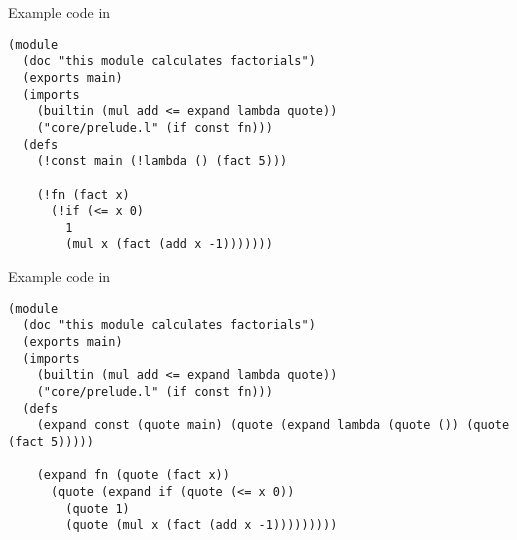 

\begin{frame}
\maketitle
\end{frame}

\begin{frame}[fragile]{Example code in \lang}

\begin{verbatim}
(module
  (doc "this module calculates factorials")
  (exports main)
  (imports
    (builtin (mul add <= expand lambda quote))
    ("core/prelude.l" (if const fn)))
  (defs
    (!const main (!lambda () (fact 5)))

    (!fn (fact x)
      (!if (<= x 0)
        1
        (mul x (fact (add x -1)))))))
\end{verbatim}
\end{frame}

\begin{frame}[fragile]{Example code in \lang}
\begin{verbatim}
(module
  (doc "this module calculates factorials")
  (exports main)
  (imports
    (builtin (mul add <= expand lambda quote))
    ("core/prelude.l" (if const fn)))
  (defs
    (expand const (quote main) (quote (expand lambda (quote ()) (quote (fact 5)))))

    (expand fn (quote (fact x))
      (quote (expand if (quote (<= x 0))
        (quote 1)
        (quote (mul x (fact (add x -1)))))))))
\end{verbatim}
\end{frame}

